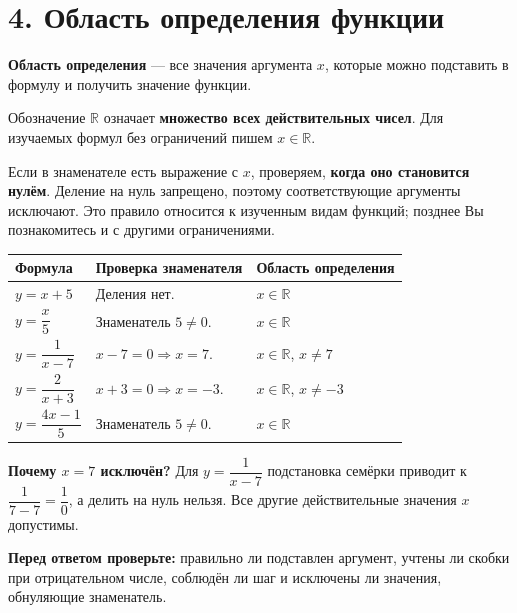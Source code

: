 \documentclass[a4paper,12pt]{article}
\newcommand{\key}[1]{\textbf{\color{darkaccent}#1}}
\newcommand{\sectionrule}{\vspace{-0.55em}{\color{accent}\hrule height .6pt}\vspace{0.5em}}
\begin{document}
\section*{4. Область определения функции}
\sectionrule
\key{Область определения} --- все значения аргумента $x$, которые можно подставить в формулу и получить значение функции.

Обозначение $\mathbb R$ означает \key{множество всех действительных чисел}. Для изучаемых формул без ограничений пишем $x\in\mathbb R$.

Если в знаменателе есть выражение с $x$, проверяем, \key{когда оно становится нулём}. Деление на нуль запрещено, поэтому соответствующие аргументы исключают. Это правило относится к изученным видам функций; позднее Вы познакомитесь и с другими ограничениями.

\begin{center}
\renewcommand{\arraystretch}{1.95}
\begin{tabularx}{\linewidth}{@{}p{39mm}X p{50mm}@{}}
\toprule
\textbf{Формула} & \textbf{Проверка знаменателя} & \textbf{Область определения}\\
\midrule
$y=x+5$ & Деления нет. & $x\in\mathbb R$\\
$y=\dfrac{x}{5}$ & Знаменатель $5\ne0$. & $x\in\mathbb R$\\
$y=\dfrac{1}{x-7}$ & $x-7=0\Rightarrow x=7$. & $x\in\mathbb R$, $x\ne7$\\
$y=\dfrac{2}{x+3}$ & $x+3=0\Rightarrow x=-3$. & $x\in\mathbb R$, $x\ne-3$\\
$y=\dfrac{4x-1}{5}$ & Знаменатель $5\ne0$. & $x\in\mathbb R$\\
\bottomrule
\end{tabularx}
\end{center}

\key{Почему $x=7$ исключён?} Для $y=\dfrac1{x-7}$ подстановка семёрки приводит к $\dfrac1{7-7}=\dfrac10$, а делить на нуль нельзя. Все другие действительные значения $x$ допустимы.

\key{Перед ответом проверьте:} правильно ли подставлен аргумент, учтены ли скобки при отрицательном числе, соблюдён ли шаг и исключены ли значения, обнуляющие знаменатель.
\clearpage
\end{document}

